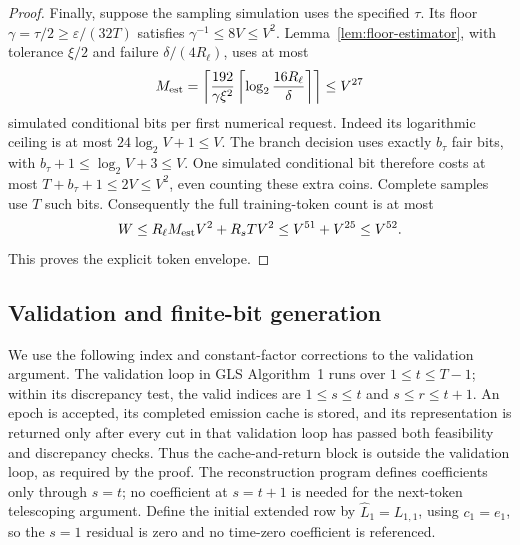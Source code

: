 \documentclass[11pt]{article}
\theoremstyle{definition}
\theoremstyle{remark}
\begin{document}
\begin{proof}
Finally, suppose the sampling simulation uses the specified $\tau$. Its floor
$\gamma=\tau/2\ge\varepsilon/(32T)$ satisfies
$\gamma^{-1}\le8V\le V^2$.
Lemma~\ref{lem:floor-estimator}, with tolerance $\xi/2$ and failure
$\delta/(4R_\ell)$, uses at most
\[
M_{\rm est}=
\left\lceil\frac{192}{\gamma\xi^2}
\left\lceil\log_2\frac{16R_\ell}{\delta}\right\rceil\right\rceil
\le V^{27}
\]
simulated conditional bits per first numerical request. Indeed its logarithmic ceiling is at most $24\log_2V+1\le V$.
The branch decision uses exactly $b_\tau$ fair bits, with
$b_\tau+1\le\log_2V+3\le V$.
One simulated conditional bit therefore costs at most
$T+b_\tau+1\le2V\le V^2$, even counting these extra coins. Complete samples use $T$ such bits. Consequently the full training-token count is at most
\[
W\le R_\ell M_{\rm est}V^2+R_sTV^2
\le V^{51}+V^{25}\le V^{52}.
\]
This proves the explicit token envelope.
\end{proof}

\subsection{Validation and finite-bit generation}\label{sec:gls-validation-arithmetic}

We use the following index and constant-factor corrections to the validation argument. The validation loop in GLS Algorithm~1 runs over $1\le t\le T-1$; within its discrepancy test, the valid indices are $1\le s\le t$ and $s\le r\le t+1$. An epoch is accepted, its completed emission cache is stored, and its representation is returned only after every cut in that validation loop has passed both feasibility and discrepancy checks. Thus the cache-and-return block is outside the validation loop, as required by the proof. The reconstruction program defines coefficients only through $s=t$; no coefficient at $s=t+1$ is needed for the next-token telescoping argument. Define the initial extended row by $\hat L_1=L_{1,1}$, using $c_1=e_1$, so the $s=1$ residual is zero and no time-zero coefficient is referenced.
\end{document}
